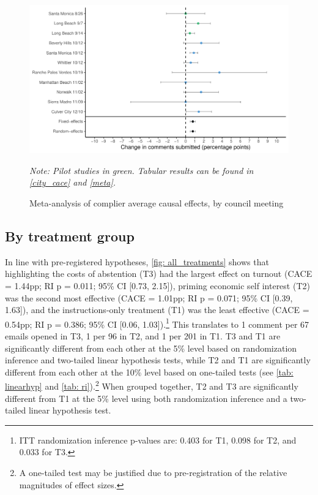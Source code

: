 \documentclass[12pt,final,fleqn]{article}
\theoremstyle{plain}
\begin{document}
\begin{figure}[H]
\includegraphics[width = \textwidth]{../figs/fg2.pdf}
\caption{Meta-analysis of complier average causal effects, by council meeting}
\vspace{-0.5cm}
{\small \textit{Note: Pilot studies in green. Tabular results can be found in \autoref{city_cace} and \autoref{meta}.}}
\label{fig: meta}
\end{figure}


\subsection{By treatment group}\label{sec: results_group}

In line with pre-registered hypotheses, \autoref{fig: all_treatments} shows that highlighting the costs of abstention (T3) had the largest effect on turnout (CACE = 1.44pp; RI p = 0.011; 95\% CI [0.73, 2.15]), priming economic self interest (T2) was the second most effective (CACE = 1.01pp; RI p = 0.071; 95\% CI [0.39, 1.63]), and the instructions-only treatment (T1) was the least effective (CACE = 0.54pp; RI p = 0.386; 95\% CI [0.06, 1.03]).\footnote{ITT randomization inference p-values are: 0.403 for T1, 0.098 for T2, and 0.033 for T3.} This translates to 1 comment per 67 emails opened in T3, 1 per 96 in T2, and 1 per 201 in T1. T3 and T1 are significantly different from each other at the 5\% level based on randomization inference and two-tailed linear hypothesis tests, while T2 and T1 are significantly different from each other at the 10\% level based on one-tailed tests (see \autoref{tab: linearhyp} and \autoref{tab: ri}).\footnote{A one-tailed test may be justified due to pre-registration of the relative magnitudes of effect sizes.} When grouped together, T2 and T3 are significantly different from T1 at the 5\% level using both randomization inference and a two-tailed linear hypothesis test. 
\end{document}
